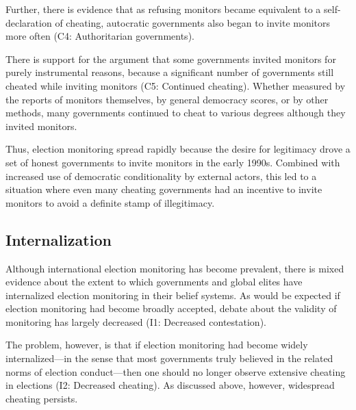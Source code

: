 Further, there is evidence that as refusing monitors became equivalent to a self-declaration of cheating, autocratic governments also began to invite monitors more often (C4: Authoritarian governments).

There is support for the argument that some governments invited monitors for purely instrumental reasons, because a significant number of governments still cheated while inviting monitors (C5: Continued cheating). Whether measured by the reports of monitors themselves, by general democracy scores, or by other methods, many governments continued to cheat to various degrees although they invited monitors.

Thus, election monitoring spread rapidly because the desire for legitimacy drove a set of honest governments to invite monitors in the early 1990s. Combined with increased use of democratic conditionality by external actors, this led to a situation where even many cheating governments had an incentive to invite monitors to avoid a definite stamp of illegitimacy.

\subsection{Internalization}
Although international election monitoring has become prevalent, there is mixed evidence about the extent to which governments and global elites have internalized election monitoring in their belief systems. As would be expected if election monitoring had become broadly accepted, debate about the validity of monitoring has largely decreased (I1: Decreased contestation).

The problem, however, is that if election monitoring had become widely internalized—in the sense that most governments truly believed in the related norms of election conduct—then one should no longer observe extensive cheating in elections (I2: Decreased cheating). As discussed above, however, widespread cheating persists.
